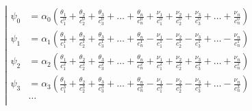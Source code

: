 \begin{equation*} \left| \begin{aligned}
\psi_0 &= \alpha_0
  \left(
  \frac{\theta_1}{c_1^0}
+ \frac{\theta_2}{c_2^0}
+ \frac{\theta_3}{c_3^0}
+ \ldots
+ \frac{\theta_n}{c_n^0}
+ \frac{\nu_1}{c_1^0}
+ \frac{\nu_2}{c_2^0}
+ \frac{\nu_3}{c_3^0}
+ \ldots
+ \frac{\nu_n}{c_n^0}
  \right) \\
%
\psi_1 &= \alpha_1
  \left(
  \frac{\theta_1}{c_1^1}
+ \frac{\theta_2}{c_2^1}
+ \frac{\theta_3}{c_3^1}
+ \ldots
+ \frac{\theta_n}{c_n^1}
- \frac{\nu_1}{c_1^1}
- \frac{\nu_2}{c_2^1}
- \frac{\nu_3}{c_3^1}
+ \ldots
- \frac{\nu_n}{c_n^1}
  \right) \\
%
\psi_2 &= \alpha_2
  \left(
  \frac{\theta_1}{c_1^2}
+ \frac{\theta_2}{c_2^2}
+ \frac{\theta_3}{c_3^2}
+ \ldots
+ \frac{\theta_n}{c_n^2}
+ \frac{\nu_1}{c_1^2}
+ \frac{\nu_2}{c_2^2}
+ \frac{\nu_3}{c_3^2}
+ \ldots
+ \frac{\nu_n}{c_n^2}
  \right) \\
%
\psi_3 &= \alpha_3
  \left(
  \frac{\theta_1}{c_1^3}
+ \frac{\theta_2}{c_2^3}
+ \frac{\theta_3}{c_3^3}
+ \ldots
+ \frac{\theta_n}{c_n^3}
- \frac{\nu_1}{c_1^3}
- \frac{\nu_2}{c_2^3}
- \frac{\nu_3}{c_3^3}
+ \ldots
- \frac{\nu_n}{c_n^3}
  \right) \\
%
&\ldots \\
\end{aligned} \right. \end{equation*}

